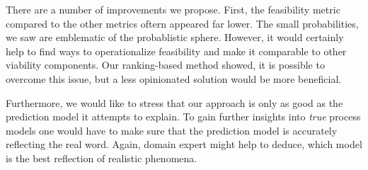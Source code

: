 \documentclass[./../../paper.tex]{subfiles}
\begin{document}
There are a number of improvements we propose. First, the feasibility metric compared to the other metrics oftern appeared far lower. The small probabilities, we saw are emblematic of the probablistic sphere. However, it would certainly help to find ways to operationalize feasibility and make it comparable to other viability components. Our ranking-based method showed, it is possible to overcome this issue, but a less opinionated solution would be more beneficial. 

Furthermore, we would like to stress that our approach is only as good as the prediction model it attempts to explain. To gain further insights into \emph{true} process models one would have to make sure that the prediction model is accurately reflecting the real word. Again, domain expert might help to deduce, which model is the best reflection of realistic phenomena.


\end{document}
